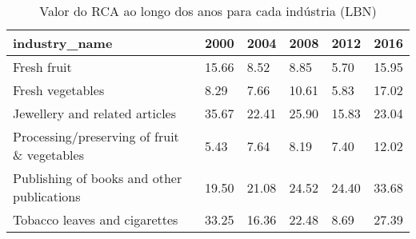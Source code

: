 \begin{table}
\centering
\caption{Valor do RCA ao longo dos anos para cada indústria (LBN)}
\begin{tabular}{p{6cm}p{1.5cm}p{1.5cm}p{1.5cm}p{1.5cm}p{1.5cm}}
\toprule
                              industry\_name &  2000 &  2004 &  2008 &  2012 &  2016 \\
\midrule
                                Fresh fruit & 15.66 &  8.52 &  8.85 &  5.70 & 15.95 \\
                           Fresh vegetables &  8.29 &  7.66 & 10.61 &  5.83 & 17.02 \\
             Jewellery and related articles & 35.67 & 22.41 & 25.90 & 15.83 & 23.04 \\
Processing/preserving of fruit \& vegetables &  5.43 &  7.64 &  8.19 &  7.40 & 12.02 \\
 Publishing of books and other publications & 19.50 & 21.08 & 24.52 & 24.40 & 33.68 \\
              Tobacco leaves and cigarettes & 33.25 & 16.36 & 22.48 &  8.69 & 27.39 \\
\bottomrule
\end{tabular}
\end{table}
